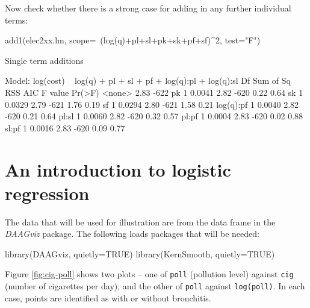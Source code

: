 Now check whether there is a strong case for adding in any further
individual terms:
\begin{fullwidth}
\begin{Schunk}
\begin{Sinput}
add1(elec2xx.lm, scope=~(log(q)+pl+sl+pk+sk+pf+sf)^2, test="F")
\end{Sinput}
\begin{Soutput}
Single term additions

Model:
log(cost) ~ log(q) + pl + sl + pf + log(q):pl + log(q):sl
          Df Sum of Sq  RSS  AIC F value Pr(>F)
<none>                 2.83 -622               
pk         1    0.0041 2.82 -620    0.22   0.64
sk         1    0.0329 2.79 -621    1.76   0.19
sf         1    0.0294 2.80 -621    1.58   0.21
log(q):pf  1    0.0040 2.82 -620    0.21   0.64
pl:sl      1    0.0060 2.82 -620    0.32   0.57
pl:pf      1    0.0004 2.83 -620    0.02   0.88
sl:pf      1    0.0016 2.83 -620    0.09   0.77
\end{Soutput}
\end{Schunk}
\end{fullwidth}

\section{An introduction to logistic regression}\label{sec:logistic}
The data that will be used for illustration are from the data frame
 in the {\em DAAGviz} package.  The following loads
packages that will be needed:

\begin{Schunk}
\begin{Sinput}
library(DAAGviz, quietly=TRUE)
library(KernSmooth, quietly=TRUE)
\end{Sinput}
\end{Schunk}

Figure \ref{fig:cig-poll} shows two plots -- one of \texttt{poll}
(pollution level) against \texttt{cig} (number of cigarettes per day),
and the other of \texttt{poll} against \texttt{log(poll)}.  In each
case, points are identified as with or without bronchitis.

